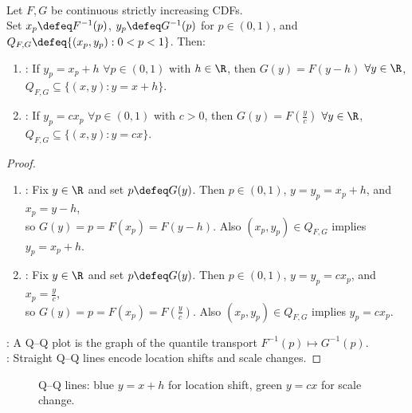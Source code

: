 \begin{proposition} \label{prop:qq-location-scale-effects} \\
Let $F,G$ be continuous strictly increasing CDFs.\\
Set $x_p\defeq F^{-1}(p)$, $y_p\defeq G^{-1}(p)$ for $p\in(0,1)$, and $Q_{F,G}\defeq\{(x_p,y_p):0<p<1\}$. Then:
\begin{enumerate}[label=(\roman*)]
\setlength{\itemsep}{0pt}
\item {}: If $y_p=x_p+h$ $\forall p\in(0,1)$ with $h\in\R$, then $G(y)=F(y-h)$ $\forall y\in\R$, $Q_{F,G}\subseteq\{(x,y):y=x+h\}$.
\item {}: If $y_p=cx_p$ $\forall p\in(0,1)$ with $c>0$, then $G(y)=F(\frac{y}{c})$ $\forall y\in\R$, $Q_{F,G}\subseteq\{(x,y):y=cx\}$.
\end{enumerate}
\begin{proof}
\begin{enumerate}[label=(\roman*)]
\setlength{\itemsep}{0pt}
\item {}: Fix $y\in\R$ and set $p\defeq G(y)$. Then $p\in(0,1)$, $y=y_p=x_p+h$, and $x_p=y-h$,\\
so $G(y)=p=F(x_p)=F(y-h)$. Also $(x_p,y_p)\in Q_{F,G}$ implies $y_p=x_p+h$.
\item {}: Fix $y\in\R$ and set $p\defeq G(y)$. Then $p\in(0,1)$, $y=y_p=cx_p$, and $x_p=\frac{y}{c}$,\\
so $G(y)=p=F(x_p)=F(\frac{y}{c})$. Also $(x_p,y_p)\in Q_{F,G}$ implies $y_p=cx_p$.
\end{enumerate}
: A Q--Q plot is the graph of the quantile transport $F^{-1}(p)\mapsto G^{-1}(p)$.\\
: Straight Q--Q lines encode location shifts and scale changes.
\end{proof}
\end{proposition}

\begin{figure}[H]
  \centering
  
  \caption{Q--Q lines: blue $y=x+h$ for location shift, green $y=cx$ for scale change.}
  \label{fig:eda-qq-effects}
\end{figure}

